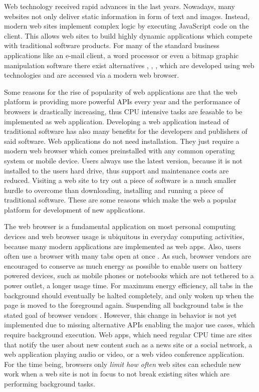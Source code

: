 \documentclass[
	ruledheaders=section,%
	class=report,%
	thesis={type=bachelor},%
	accentcolor=9c,%
	custommargins=true,%
	marginpar=false,%
	parskip=half-,%
	fontsize=11pt,%
]{tudapub}
\begin{document}
Web technology received rapid advances in the last years. Nowadays, many websites not only deliver static information in form of text and images. Instead, modern web sites implement complex logic by executing JavaScript code on the client. This allows web sites to build highly dynamic applications which compete with traditional software products. For many of the standard business applications like an e-mail client, a word processor or even a bitmap graphic manipulation software there exist alternatives \cite{gmail}, \cite{office365-online}, \cite{photopea}, which are developed using web technologies and are accessed via a modern web browser.

Some reasons for the rise of popularity of web applications are that the web platform is providing more powerful APIs every year and the performance of browsers is drastically increasing, thus CPU intensive tasks are feasable to be implemented as web application. Developing a web application instead of traditional software has also many benefits for the developers and publishers of said software. Web applications do not need installation. They just require a modern web browser which comes preinstalled with any common operating system or mobile device. Users always use the latest version, because it is not installed to the users hard drive, thus support and maintenance costs are reduced. Visiting a web site to try out a piece of software is a much smaller hurdle to overcome than downloading, installing and running a piece of traditional software. These are some reasons which make the web a popular platform for development of new applications.

The web browser is a fundamental application on most personal computing devices and web browser usage is ubiquitous in everyday computing activities, because many modern applications are implemented as web apps. Also, users often use a browser with many tabs open at once \cite{weinreich2008not}. As such, browser vendors are encouraged to conserve as much energy as possible to enable users on battery powered devices, such as mobile phones or notebooks which are not tethered to a power outlet, a longer usage time. For maximum energy efficiency, all tabs in the background should eventually be halted completely, and only woken up when the page is moved to the foreground again. Suspending all background tabs is the stated goal of browser vendors \cite{chrome-background-tabs-roadmap}. However, this change in behavior is not yet implemented due to missing alternative APIs enabling the major use cases, which require background execution. Web apps, which need regular CPU time are sites that notify the user about new content such as a news site or a social network, a web application playing audio or video, or a web video conference application. For the time being, browsers only \textit{limit how often} web sites can schedule new work when a web site is not in focus to not break existing sites which are performing background tasks.
\end{document}
